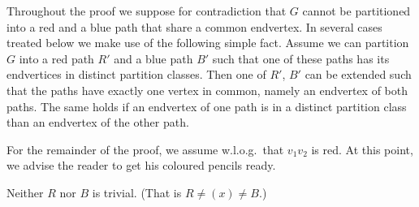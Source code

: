 \documentclass[a4paper,10pt]{article}
\begin{document}
Throughout the proof we suppose for contradiction that $G$ cannot be partitioned into a red and a blue path that share a common endvertex.
In several cases treated below we make use of the following simple fact.
Assume we can partition $G$ into a red path $R'$ and a blue path $B'$ such that one of these paths has its endvertices in distinct partition classes.
Then one of $R'$, $B'$ can be extended such that the paths have exactly one vertex in common, namely an endvertex of both paths.
The same holds if an endvertex of one path is in a distinct partition class than an endvertex of the other path.

For the remainder of the proof, we assume w.l.o.g.~that $v_1v_2$ is red.
At this point, we advise the reader to get his coloured pencils ready.

\begin{claim}\label{clm:non-trivial}
Neither $R$ nor $B$ is trivial. (That is $R\neq(x)\neq B$.)
\end{claim}
\end{document}
